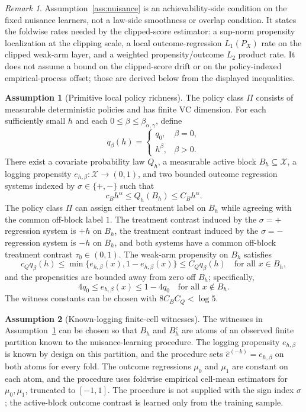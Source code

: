 \documentclass[11pt]{article}
\theoremstyle{definition}
\newtheorem{assumption}{Assumption}
\theoremstyle{plain}
\theoremstyle{remark}
\newtheorem{remark}{Remark}
\begin{document}
\begin{remark}
Assumption~\ref{ass:nuisance} is an achievability-side condition on the
fixed nuisance learners, not a law-side smoothness or overlap condition.  It
states the foldwise rates needed by the clipped-score estimator: a sup-norm
propensity localization at the clipping scale, a local outcome-regression
\(L_1(P_X)\) rate on the clipped weak-arm layer, and a weighted
propensity/outcome \(L_2\) product rate.  It does not assume a bound on the
clipped-score drift or on the policy-indexed empirical-process offset; those
are derived below from the displayed inequalities.
\end{remark}

\begin{assumption}[Primitive local policy richness]\label{ass:primitive-cube}
The policy class \(\Pi\) consists of measurable deterministic policies and has
finite VC dimension.  For each sufficiently small \(h\) and each
\(0\le\beta\le\beta_{\alpha,\gamma}\), define
\[
q_\beta(h)=
\begin{cases}
q_0,& \beta=0,\\
h^\beta,& \beta>0.
\end{cases}
\]
There exist a covariate probability law \(Q_h\), a measurable active block
\(B_h\subseteq\mathcal X\), a logging propensity
\(e_{h,\beta}:\mathcal X\to(0,1)\), and two bounded outcome regression
systems indexed by \(\sigma\in\{+,-\}\) such that
\[
c_B h^\alpha\le Q_h(B_h)\le C_B h^\alpha.
\]
The policy class \(\Pi\) can assign either treatment label on \(B_h\) while
agreeing with the common off-block label \(1\).  The treatment contrast
induced by the \(\sigma=+\) regression system is \(+h\) on \(B_h\), the
treatment contrast induced by the \(\sigma=-\) regression system is \(-h\)
on \(B_h\), and both systems have a common off-block treatment contrast
\(\tau_0\in(0,1)\).  The weak-arm propensity on \(B_h\) satisfies
\[
c_Qq_\beta(h)\le \min\{e_{h,\beta}(x),1-e_{h,\beta}(x)\}
\le C_Qq_\beta(h)
\quad\text{for all }x\in B_h,
\]
and the propensities are bounded away from zero off \(B_h\); specifically,
\[
4q_0\le e_{h,\beta}(x)\le 1-4q_0
\quad\text{for all }x\notin B_h.
\]
The witness constants can be chosen with \(8C_BC_Q<\log 5\).
\end{assumption}

\begin{assumption}[Known-logging finite-cell witnesses]\label{ass:learnable-cube}
The witnesses in Assumption~\ref{ass:primitive-cube} can be chosen so that
\(B_h\) and \(B_h^c\) are atoms of an observed finite partition known to the
nuisance-learning procedure.  The logging propensity \(e_{h,\beta}\) is known
by design on this partition, and the procedure sets
\(\widehat e^{(-k)}=e_{h,\beta}\) on both atoms for every fold.  The outcome
regressions \(\mu_0\) and \(\mu_1\) are constant on each atom, and the
procedure uses foldwise empirical cell-mean estimators for
\(\mu_0,\mu_1\), truncated to \([-1,1]\).  The procedure is not supplied with
the sign index \(\sigma\); the active-block outcome contrast is learned only
from the training sample.
\end{assumption}
\end{document}
